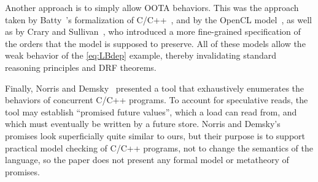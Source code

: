 Another approach is to simply allow OOTA behaviors.
This was the approach taken by Batty~\etal's formalization of C/C++~\cite{Batty:2011}, and by the OpenCL model~\cite{opencl-model},
as well as by Crary and Sullivan~\cite{Crary2015}, who introduced a more fine-grained specification of the orders that the model is supposed to preserve.
All of these models allow the weak behavior of the \ref{eq:LBdep} example, thereby invalidating standard reasoning principles and DRF theorems.

Finally, Norris and Demsky~\cite{CDSchecker} presented a tool
that exhaustively enumerates the behaviors of concurrent C/C++ programs.
To account for speculative reads, the tool may establish ``promised
future values'', which a load can read from, and which must eventually
be written by a future store.  Norris and Demsky's promises look
superficially quite similar to ours, but their purpose is to support
practical model checking of C/C++ programs, not to change the semantics
of the language, so the paper does not present any formal model or
metatheory of promises.




